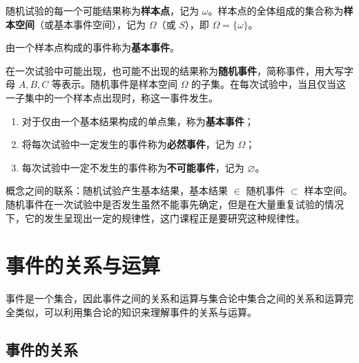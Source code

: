 \documentclass[lang=cn,11pt]{elegantbook}
\begin{document}
\begin{definition}[样本空间] \label{def:sample-space}
随机试验的每一个可能结果称为\textbf{样本点}，记为 \(\omega\)。样本点的全体组成的集合称为\textbf{样本空间}（或基本事件空间），记为 \(\Omega\)（或 \(S\)），即 \(\Omega = \{\omega\}\)。
\end{definition}

由一个样本点构成的事件称为\textbf{基本事件}。

\begin{definition}[随机事件] \label{def:random-event}
在一次试验中可能出现，也可能不出现的结果称为\textbf{随机事件}，简称事件，用大写字母 \(A, B, C\) 等表示。随机事件是样本空间 \(\Omega\) 的子集。在每次试验中，当且仅当这一子集中的一个样本点出现时，称这一事件发生。
\end{definition}

\begin{enumerate}
    \item 对于仅由一个基本结果构成的单点集，称为\textbf{基本事件}；
    \item 将每次试验中一定发生的事件称为\textbf{必然事件}，记为 \(\Omega\)；
    \item 每次试验中一定不发生的事件称为\textbf{不可能事件}，记为 \(\varnothing\)。
\end{enumerate}

\begin{note}
概念之间的联系：随机试验产生基本结果，基本结果 \(\in\) 随机事件 \(\subset\) 样本空间。随机事件在一次试验中是否发生虽然不能事先确定，但是在大量重复试验的情况下，它的发生呈现出一定的规律性，这门课程正是要研究这种规律性。
\end{note}

\section{事件的关系与运算}

事件是一个集合，因此事件之间的关系和运算与集合论中集合之间的关系和运算完全类似，可以利用集合论的知识来理解事件的关系与运算。

\subsection{事件的关系}
\end{document}
